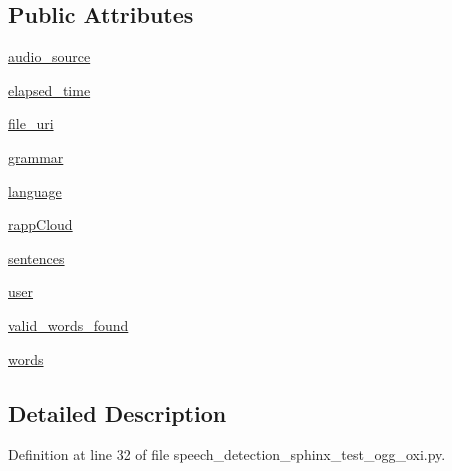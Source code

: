 \subsection*{Public Attributes}
\begin{DoxyCompactItemize}
\item 
\hyperlink{classspeech__detection__sphinx__test__ogg__oxi_1_1RappInterfaceTest_afe707fb29d6d13c1934044a3dbe49c63}{audio\-\_\-source}
\item 
\hyperlink{classspeech__detection__sphinx__test__ogg__oxi_1_1RappInterfaceTest_a209e1a0f8005f202ff747c0a2eaa681b}{elapsed\-\_\-time}
\item 
\hyperlink{classspeech__detection__sphinx__test__ogg__oxi_1_1RappInterfaceTest_acda5a42158b68be303759fcd4fc09fa9}{file\-\_\-uri}
\item 
\hyperlink{classspeech__detection__sphinx__test__ogg__oxi_1_1RappInterfaceTest_a107aea8fdb3ff623b2b813957999149c}{grammar}
\item 
\hyperlink{classspeech__detection__sphinx__test__ogg__oxi_1_1RappInterfaceTest_a197c7d92827433adfe93f56baefbde5e}{language}
\item 
\hyperlink{classspeech__detection__sphinx__test__ogg__oxi_1_1RappInterfaceTest_a45b619edddd298ba90075cb446f79e93}{rapp\-Cloud}
\item 
\hyperlink{classspeech__detection__sphinx__test__ogg__oxi_1_1RappInterfaceTest_a83c05a45ccb94ba78b3b208a4badf1f4}{sentences}
\item 
\hyperlink{classspeech__detection__sphinx__test__ogg__oxi_1_1RappInterfaceTest_ae17370c18d7006f3c55834a90d176c19}{user}
\item 
\hyperlink{classspeech__detection__sphinx__test__ogg__oxi_1_1RappInterfaceTest_a74ac425a0ac46811a1f5e3796cc92e71}{valid\-\_\-words\-\_\-found}
\item 
\hyperlink{classspeech__detection__sphinx__test__ogg__oxi_1_1RappInterfaceTest_ae6a274d1b4554695797d5ef5ae3fe2b0}{words}
\end{DoxyCompactItemize}


\subsection{Detailed Description}


Definition at line 32 of file speech\-\_\-detection\-\_\-sphinx\-\_\-test\-\_\-ogg\-\_\-oxi.\-py.



